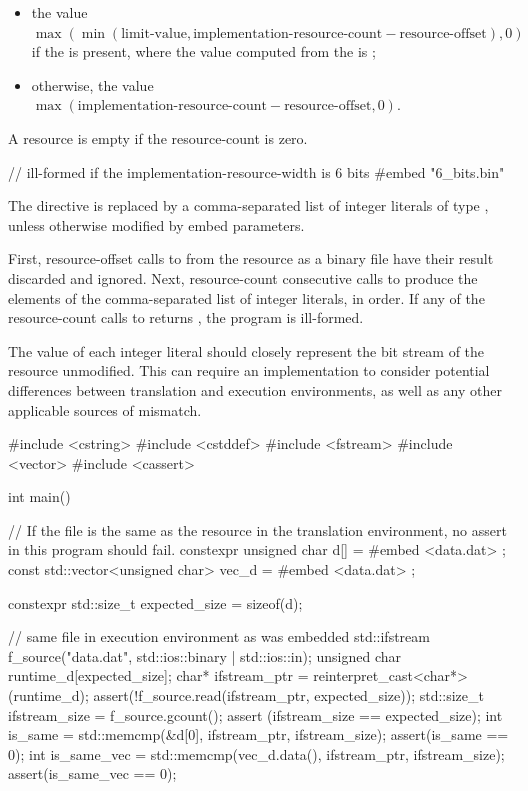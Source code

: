 \begin{itemize}
\item
  the value $\max(\min(\text{limit-value}, \text{implementation-resource-count} - \text{resource-offset}), 0)$
  if the   is present,
  where the value computed from the   is ;
\item
  otherwise, the value $\max(\text{implementation-resource-count} - \text{resource-offset}, 0)$.
\end{itemize}
A resource is empty if the resource-count is zero.

\pnum
\begin{example}
\begin{codeblock}
// ill-formed if the implementation-resource-width is 6 bits
#embed "6_bits.bin"
\end{codeblock}
\end{example}

\pnum
The  directive is replaced by a comma-separated list of integer
literals of type , unless otherwise modified by embed
parameters.

\pnum
First,
resource-offset calls to 
from the resource as a binary file
have their result discarded and ignored.
Next,
resource-count consecutive calls to 
produce the elements of the comma-separated list of integer literals, in order.
If any of the resource-count calls to  returns ,
the program is ill-formed.

\pnum
\recommended The value of each integer literal should closely represent
the bit stream of the resource unmodified.
This can require an implementation to consider potential differences between
translation and execution environments, as well as any other applicable
sources of mismatch.

\begin{example}
\begin{codeblock}
#include <cstring>
#include <cstddef>
#include <fstream>
#include <vector>
#include <cassert>

int main() {
  // If the file is the same as the resource in the translation environment, no assert in this program should fail.
  constexpr unsigned char d[] = {
#embed <data.dat>
  };
  const std::vector<unsigned char> vec_d = {
#embed <data.dat>
  };

  constexpr std::size_t expected_size = sizeof(d);

  // same file in execution environment as was embedded
  std::ifstream f_source("data.dat", std::ios::binary | std::ios::in);
  unsigned char runtime_d[expected_size];
  char* ifstream_ptr = reinterpret_cast<char*>(runtime_d);
  assert(!f_source.read(ifstream_ptr, expected_size));
  std::size_t ifstream_size = f_source.gcount();
  assert (ifstream_size == expected_size);
  int is_same = std::memcmp(&d[0], ifstream_ptr, ifstream_size);
  assert(is_same == 0);
  int is_same_vec = std::memcmp(vec_d.data(), ifstream_ptr, ifstream_size);
  assert(is_same_vec == 0);
}
\end{codeblock}
\end{example}

